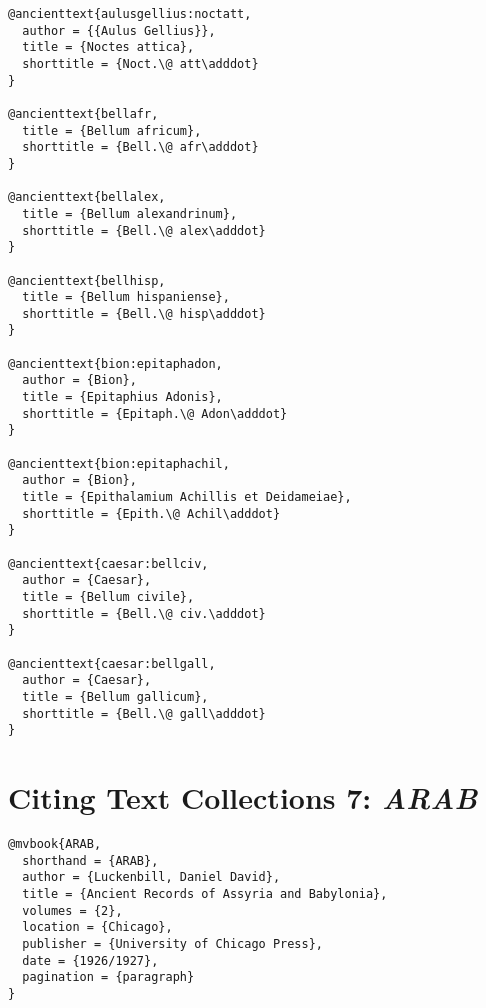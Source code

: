 \documentclass[a4paper]{article}
\renewcommand\footnote[1]{##1}%
\begin{document}
\begin{verbatim}
@ancienttext{aulusgellius:noctatt,
  author = {{Aulus Gellius}},
  title = {Noctes attica},
  shorttitle = {Noct.\@ att\adddot}
}

@ancienttext{bellafr,
  title = {Bellum africum},
  shorttitle = {Bell.\@ afr\adddot}
}

@ancienttext{bellalex,
  title = {Bellum alexandrinum},
  shorttitle = {Bell.\@ alex\adddot}
}

@ancienttext{bellhisp,
  title = {Bellum hispaniense},
  shorttitle = {Bell.\@ hisp\adddot}
}

@ancienttext{bion:epitaphadon,
  author = {Bion},
  title = {Epitaphius Adonis},
  shorttitle = {Epitaph.\@ Adon\adddot}
}

@ancienttext{bion:epitaphachil,
  author = {Bion},
  title = {Epithalamium Achillis et Deidameiae},
  shorttitle = {Epith.\@ Achil\adddot}
}

@ancienttext{caesar:bellciv,
  author = {Caesar},
  title = {Bellum civile},
  shorttitle = {Bell.\@ civ.\adddot}
}

@ancienttext{caesar:bellgall,
  author = {Caesar},
  title = {Bellum gallicum},
  shorttitle = {Bell.\@ gall\adddot}
}
\end{verbatim}

\exampleabbreviations
{}

\section{Citing Text Collections 7: \emph{ARAB}}

\begin{verbatim}
@mvbook{ARAB,
  shorthand = {ARAB},
  author = {Luckenbill, Daniel David},
  title = {Ancient Records of Assyria and Babylonia},
  volumes = {2},
  location = {Chicago},
  publisher = {University of Chicago Press},
  date = {1926/1927},
  pagination = {paragraph}
}
\end{verbatim}

\exampleabbreviations
{}
\end{document}
